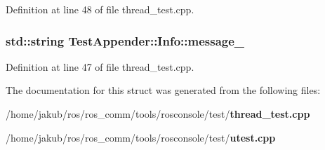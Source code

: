 Definition at line 48 of file thread\_\-test.cpp.

\subsubsection[{message\_\-}]{\setlength{\rightskip}{0pt plus 5cm}std::string {\bf TestAppender::Info::message\_\-}}\label{structTestAppender_1_1Info_a14dcc8938ccc8119e07eef607dd6d209}


Definition at line 47 of file thread\_\-test.cpp.



The documentation for this struct was generated from the following files:\begin{DoxyCompactItemize}
\item 
/home/jakub/ros/ros\_\-comm/tools/rosconsole/test/{\bf thread\_\-test.cpp}\item 
/home/jakub/ros/ros\_\-comm/tools/rosconsole/test/{\bf utest.cpp}\end{DoxyCompactItemize}

